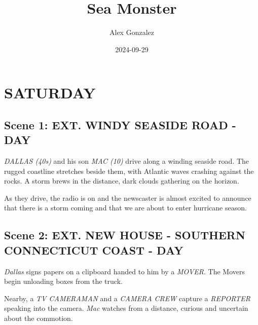 \documentclass[12pt]{article}
\title{Sea Monster}
\author{Alex Gonzalez}
\date{2024-09-29}
\begin{document}
\maketitle

\section*{SATURDAY}

\subsection*{Scene 1: EXT. WINDY SEASIDE ROAD - DAY}

\textit{DALLAS (40s)} and his son \textit{MAC (10)} drive along a winding seaside road. The rugged coastline stretches beside them, with Atlantic waves crashing against the rocks. A storm brews in the distance, dark clouds gathering on the horizon.

As they drive, the radio is on and the newscaster is almost excited to announce that there is a storm coming and that we are about to enter hurricane season.

\subsection*{Scene 2: EXT. NEW HOUSE - SOUTHERN CONNECTICUT COAST - DAY}

\textit{Dallas} signs papers on a clipboard handed to him by a \textit{MOVER}. The Movers begin unloading boxes from the truck.

Nearby, a \textit{TV CAMERAMAN} and a \textit{CAMERA CREW} capture a \textit{REPORTER} speaking into the camera. \textit{Mac} watches from a distance, curious and uncertain about the commotion.

\end{document}
